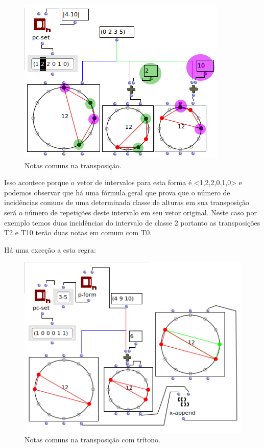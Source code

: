\documentclass[
	12pt,				%
	openright,			%
	twoside,			%
	a4paper,			%
	english,			%
	french,				%
	spanish,			%
	brazil				%
	]{abntex2}
\begin{document}
\begin{figure}[!h]
	\caption{\label{fig_grafico}Notas comuns na transposição. }
	\begin{center}
	    \includegraphics[scale=0.7]{OM_settheory/notas_comuns_2e10.png}
	\end{center}
\end{figure}



Isso acontece porque o vetor de intervalos para esta forma é <1,2,2,0,1,0> e podemos observar que há uma fórmula geral que prova que o número de incidências comuns de uma determinada classe de alturas em sua transposição será o número de repetições deste intervalo em seu vetor original. Neste caso por exemplo temos duas incidências do intervalo de classe 2 portanto as transposições T2 e T10 terão duas notas em comum com T0.

Há uma exceção a esta regra:
 
\begin{figure}[!h]
	\caption{\label{fig_grafico}Notas comuns na transposição com trítono. }
	\begin{center}
	    \includegraphics[scale=0.7]{OM_settheory/notas_comuns_tritono.png}
	\end{center}
\end{figure}
\end{document}
